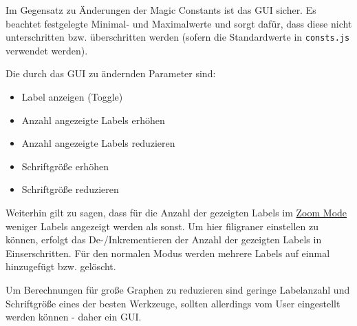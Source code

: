 
Im Gegensatz zu Änderungen der Magic Constants ist das GUI sicher. Es beachtet festgelegte Minimal- und Maximalwerte
und sorgt dafür, dass diese nicht unterschritten bzw. überschritten werden (sofern die Standardwerte in \texttt{consts.js} verwendet werden).

Die durch das GUI zu ändernden Parameter sind:
\begin{itemize}
    \item Label anzeigen (Toggle)
    \item Anzahl angezeigte Labels erhöhen
    \item Anzahl angezeigte Labels reduzieren
    \item Schriftgröße erhöhen
    \item Schriftgröße reduzieren
\end{itemize}

Weiterhin gilt zu sagen, dass für die Anzahl der gezeigten Labels im \hyperref[subsec:zoom]{Zoom Mode} weniger Labels angezeigt werden als sonst.
Um hier filigraner einstellen zu können, erfolgt das De-/Inkrementieren der Anzahl der gezeigten Labels in Einserschritten.
Für den normalen Modus werden mehrere Labels auf einmal hinzugefügt bzw. gelöscht.

Um Berechnungen für große Graphen zu reduzieren sind geringe Labelanzahl und Schriftgröße eines der besten Werkzeuge, sollten allerdings vom User eingestellt werden können - daher ein GUI.
